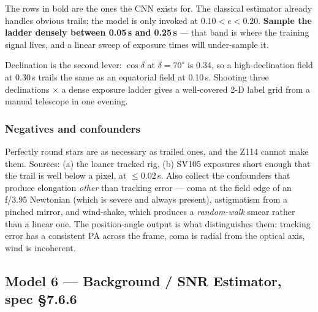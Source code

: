 \documentclass[11pt]{article}
\begin{document}
\begin{keybox}
The rows in bold are the ones the CNN exists for. The classical estimator
already handles obvious trails; the model is only invoked at
$0.10 < e < 0.20$. \textbf{Sample the ladder densely between 0.05\,s and
0.25\,s} --- that band is where the training signal lives, and a linear sweep of
exposure times will under-sample it.

Declination is the second lever: $\cos\delta$ at $\delta = 70^\circ$ is 0.34, so
a high-declination field at 0.30\,s trails the same as an equatorial field at
0.10\,s. Shooting three declinations $\times$ a dense exposure ladder gives a
well-covered 2-D label grid from a manual telescope in one evening.
\end{keybox}

\subsubsection*{Negatives and confounders}

Perfectly round stars are as necessary as trailed ones, and the Z114 cannot make
them. Sources: (a) the loaner tracked rig, (b) SV105 exposures short enough that
the trail is well below a pixel, at $\leq$0.02\,s. Also collect the confounders
that produce elongation \emph{other} than tracking error --- coma at the field
edge of an f/3.95 Newtonian (which is severe and always present),
astigmatism from a pinched mirror, and wind-shake, which produces a
\emph{random-walk} smear rather than a linear one. The position-angle output
is what distinguishes them: tracking error has a consistent PA across the frame,
coma is radial from the optical axis, wind is incoherent.

\subsection{Model 6 --- Background / SNR Estimator, spec \S7.6.6}\label{m:bkg}
\end{document}
